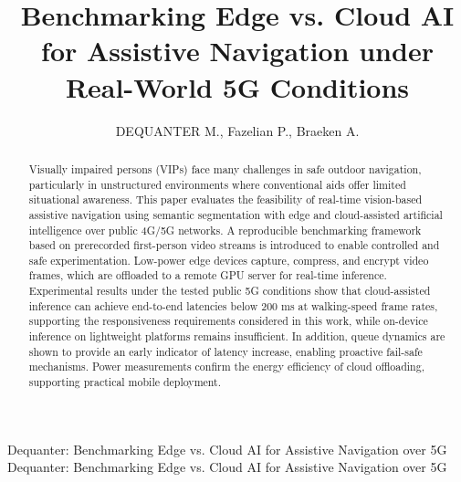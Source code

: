\documentclass{ieeeaccess}
\begin{document}

\title{Benchmarking Edge vs. Cloud AI for Assistive Navigation under Real-World 5G Conditions}
\author{\uppercase{Dequanter M.}, Fazelian P., Braeken A.}

\address[1]{Erasmushogeschool Brussel, Research Centre for Preventive Health Innovation, Brussels}
\address[2]{Vrije Universiteit Brussel}

\markboth
{Dequanter: Benchmarking Edge vs. Cloud AI for Assistive Navigation over 5G}
{Dequanter: Benchmarking Edge vs. Cloud AI for Assistive Navigation over 5G}





\begin{abstract}
Visually impaired persons (VIPs) face many challenges in safe outdoor navigation, particularly in unstructured environments where conventional aids offer limited situational awareness. This paper evaluates the feasibility of real-time vision-based assistive navigation using semantic segmentation with edge and cloud-assisted artificial intelligence over public 4G/5G networks. A reproducible benchmarking framework based on prerecorded first-person video streams is introduced to enable controlled and safe experimentation. Low-power edge devices capture, compress, and encrypt video frames, which are offloaded to a remote GPU server for real-time inference. Experimental results under the tested public 5G conditions show that cloud-assisted inference can achieve end-to-end latencies below 200 ms at walking-speed frame rates, supporting the responsiveness requirements considered in this work, while on-device inference on lightweight platforms remains insufficient. In addition, queue dynamics are shown to provide an early indicator of latency increase, enabling proactive fail-safe mechanisms. Power measurements confirm the energy efficiency of cloud offloading, supporting practical mobile deployment.

\end{abstract}
\end{document}
